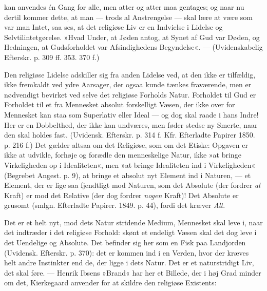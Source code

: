 \documentclass[12pt,a4paper,openany]{book}
\newcommand{\opage}[1]{\marginnote{\footnotesize\textit{[#1]}}}
\begin{document}
\opage{112}kan anvendes én Gang for alle, men atter og atter maa
gentages; og naar nu dertil kommer dette, at man ---
trods al Anstrengelse --- skal lære at være som var man
Intet, saa ses, at det religiøse Liv er en Indvielse i
Lidelse og Selvtilintetgørelse. »Hvad Under, at Jøden
antog, at Synet af Gud var Døden, og Hedningen, at
Gudsforholdet var Afsindighedens Begyndelse«. --- (Uvidenskabelig
Efterskr. p. 309 ff. 353. 370 f.)

Den religiøse Lidelse adskiller sig fra anden Lidelse
ved, at den ikke er tilfældig, ikke fremkaldt ved ydre
Aarsager, der ogsaa kunde tænkes fraværende, men er
nødvendigt bevirket ved selve det religiøse Forholds
Natur. Forholdet til Gud er Forholdet til et fra Mennesket
absolut forskelligt Væsen, der ikke over for Mennesket
kan staa som Superlativ eller Ideal --- og dog skal
raade i hans Indre! Her er en Dobbelthed, der ikke
kan undværes, men føder stedse ny Smerte, naar den skal
holdes fast. (Uvidensk. Efterskr. p. 314 f. Kfr. Efterladte
Papirer 1850. p. 216 f.) Det gælder altsaa om det
Religiøse, som om det Etiske: Opgaven er ikke at udvikle,
forhøje og forædle den menneskelige Natur, ikke
»at bringe Virkeligheden op i Idealiteten«, men »at bringe
Idealiteten ind i Virkeligheden« (Begrebet Angest. p. 9),
at bringe et absolut nyt Element ind i Naturen, --- et
Element, der er lige saa fjendtligt mod Naturen, som det
Absolute (der fordrer \textit{al} Kraft) er mod det Relative (der
dog fordrer \textit{nogen} Kraft)! Det Absolute er grusomt
(smlgn. Efterladte Papirer. 1849. p. 44), fordi det
kræver \textit{Alt}.

Det er et helt nyt, mod dets Natur stridende Medium,
Mennesket skal leve i, naar det indtræder i det religiøse
Forhold: skønt et endeligt Væsen skal det dog leve i
det Uendelige og Absolute. Det befinder sig her som en
Fisk paa Landjorden (Uvidensk. Efterskr. p. 370): det
\opage{113}er kommen ind i en Verden, hvor der kræves helt andre
Instinkter end de, der ligge i dets Natur. Det er et
naturstridigt Liv, det skal føre. --- Henrik Ibsens »Brand«
har her et Billede, der i høj Grad minder om det, Kierkegaard
anvender for at skildre den religiøse Existents:
\end{document}
